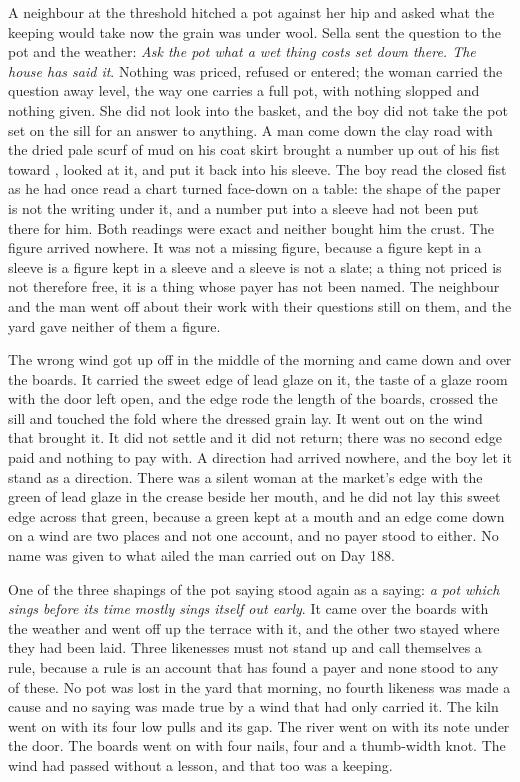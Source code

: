 A neighbour at the threshold hitched a pot against her hip and asked what the keeping would take now the grain was under wool. Sella sent the question to the pot and the weather: \emph{Ask the pot what a wet thing costs set down there. The house has said it}. Nothing was priced, refused or entered; the woman carried the question away level, the way one carries a full pot, with nothing slopped and nothing given. She did not look into the basket, and the boy did not take the pot set on the sill for an answer to anything. A man come down the clay road with the dried pale scurf of mud on his coat skirt brought a number up out of his fist toward , looked at it, and put it back into his sleeve. The boy read the closed fist as he had once read a chart turned face-down on a table: the shape of the paper is not the writing under it, and a number put into a sleeve had not been put there for him. Both readings were exact and neither bought him the crust. The figure arrived nowhere. It was not a missing figure, because a figure kept in a sleeve is a figure kept in a sleeve and a sleeve is not a slate; a thing not priced is not therefore free, it is a thing whose payer has not been named. The neighbour and the man went off about their work with their questions still on them, and the yard gave neither of them a figure.

\scenebreak

The wrong wind got up off  in the middle of the morning and came down  and over the boards. It carried the sweet edge of lead glaze on it, the taste of a glaze room with the door left open, and the edge rode the length of the boards, crossed the sill and touched the fold where the dressed grain lay. It went out on the wind that brought it. It did not settle and it did not return; there was no second edge paid and nothing to pay with. A direction had arrived nowhere, and the boy let it stand as a direction. There was a silent woman at the market's edge with the green of lead glaze in the crease beside her mouth, and he did not lay this sweet edge across that green, because a green kept at a mouth and an edge come down on a wind are two places and not one account, and no payer stood to either. No name was given to what ailed the man carried out on Day 188.

One of the three shapings of the pot saying stood again as a saying: \emph{a pot which sings before its time mostly sings itself out early}. It came over the boards with the weather and went off up the terrace with it, and the other two stayed where they had been laid. Three likenesses must not stand up and call themselves a rule, because a rule is an account that has found a payer and none stood to any of these. No pot was lost in the yard that morning, no fourth likeness was made a cause and no saying was made true by a wind that had only carried it. The kiln went on with its four low pulls and its gap. The river went on with its note under the door. The boards went on with four nails, four and a thumb-width knot. The wind had passed without a lesson, and that too was a keeping.

